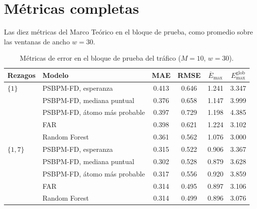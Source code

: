 \section{Métricas completas}
\label{aneC_00_03_metricas}

Las diez métricas del Marco Teórico en el bloque de prueba, como promedio sobre las ventanas de ancho $w = 30$.
\begin{table}[H]
\centering\small
\caption{Métricas de error en el bloque de prueba del tráfico ($M = 10$, $w = 30$).}
\label{tab:aneC_A}
\begin{tabular}{l l cccc}
\hline
Rezagos & Modelo & MAE & RMSE & $\overline{E}_{\max}$ & $E_{\max}^{\mathrm{glob}}$ \\
\hline
$\{1\}$   & PSBPM-FD, esperanza          & 0.413 & 0.646 & 1.241 & 3.347 \\
          & PSBPM-FD, mediana puntual    & 0.376 & 0.658 & 1.147 & 3.999 \\
          & PSBPM-FD, átomo más probable & 0.397 & 0.729 & 1.198 & 4.385 \\
          & FAR                          & 0.398 & 0.621 & 1.224 & 3.102 \\
          & Random Forest                & 0.361 & 0.562 & 1.076 & 3.000 \\
\hline
$\{1,7\}$ & PSBPM-FD, esperanza          & 0.315 & 0.522 & 0.906 & 3.367 \\
          & PSBPM-FD, mediana puntual    & 0.302 & 0.528 & 0.879 & 3.628 \\
          & PSBPM-FD, átomo más probable & 0.317 & 0.556 & 0.920 & 3.859 \\
          & FAR                          & 0.314 & 0.495 & 0.897 & 3.106 \\
          & Random Forest                & 0.314 & 0.499 & 0.896 & 3.076 \\
\hline
\end{tabular}
\end{table}

